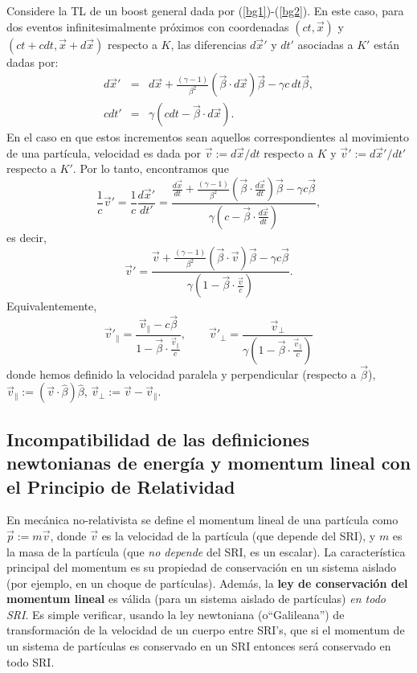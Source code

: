Considere la TL de un boost general dada por (\ref{bg1})-(\ref{bg2}). En este
caso, para dos eventos infinitesimalmente próximos con coordenadas
$(ct,\vec{x})$ y $(ct+cdt,\vec{x}+d\vec{x})$ respecto a $K$, las diferencias
$d\vec{x}'$ y $dt'$ asociadas a $K'$ están dadas por:
\begin{eqnarray}
d\vec{x}'  &  =&d\vec{x}+\frac{\left(  \gamma-1\right)  }{\beta^2}\left(  \vec{\beta}\cdot d\vec{x}\right)  \vec{\beta}-\gamma
c\,dt\vec{\beta},\\
cdt'  &  =&\gamma\left( cdt-\vec{\beta}\cdot d\vec{x}\right)  .
\end{eqnarray}
En el caso en que estos incrementos sean aquellos correspondientes al movimiento
de una partícula, velocidad es dada por
$\vec{v}:={d\vec{x}}/{dt}$ respecto a $K$ y
$\vec{v}':={d\vec{x}'}/{dt'}$ respecto a $K'$. Por lo tanto, encontramos que
\begin{equation}
\frac{1}{c}\vec{v}'=\frac{1}{c}\frac{d\vec{x}'}{dt'}=\frac{\frac{d\vec{x}}{dt}
+\frac{\left(  \gamma-1\right)  }{\beta^2}\left(  \vec{\beta}\cdot
\frac{d\vec{x}}{dt}\right)  \vec{\beta}-\gamma c\vec{\beta}}{\gamma\left(
c-\vec{\beta}\cdot \frac{d\vec{x}}{dt}\right) },
\end{equation}
es decir,
\begin{equation}
\boxed{
\vec{v}'=\frac{\vec{v}+\frac{\left(  \gamma-1\right)  }{\beta^2}\left(
\vec{\beta}\cdot \vec{v}\right)  \vec{\beta}-\gamma c\vec{\beta}}{\gamma\left(
1-\vec{\beta}\cdot \frac{\vec{v}}{c}\right) }.
} \label{transv}
\end{equation}
Equivalentemente,
\begin{equation}
\vec{v}'_\parallel=\frac{\vec{v}_\parallel- c\vec{\beta}}{1-\vec{\beta}\cdot\frac{\vec{v}_\parallel}{c} }, \qquad 
\vec{v}'_\perp=\frac{\vec{v}_\perp}{\gamma\left(
1-\vec{\beta}\cdot \frac{\vec{v}_\parallel}{c}\right) }
\end{equation}
donde hemos definido la velocidad paralela y perpendicular (respecto a $\vec\beta$), $\vec{v}_\parallel:=(\vec{v}\cdot \hat\beta)\hat\beta$,  $\vec{v}_\perp:=\vec{v}-\vec{v}_\parallel$.

\subsection{Incompatibilidad de las definiciones newtonianas de energía y momentum lineal con el Principio de Relatividad}

En mecánica no-relativista se define el momentum lineal de una partícula como
$\vec{p}:=m\vec{v}$, donde $\vec{v}$ es la velocidad de la partícula (que
depende del SRI), y $m$ es la masa de la partícula (que \textit{no depende} del SRI, es un escalar). La característica principal del momentum es su propiedad de conservación en un sistema aislado (por ejemplo, en un choque de partículas). Además, la \textbf{ley de conservación del momentum lineal} es válida (para un sistema aislado de partículas) \textit{en todo SRI}. Es simple verificar, usando la ley newtoniana (o``Galileana'') de  transformación de la velocidad de un cuerpo entre SRI's, que si el momentum de un sistema de partículas es conservado en un SRI entonces será conservado en todo SRI. 

